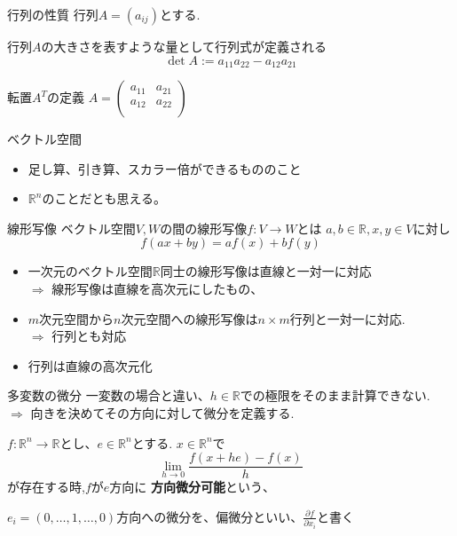 \begin{frame}{行列の性質}
行列$A=(a_{ij})$とする.

行列$A$の大きさを表すような量として行列式が定義される
\begin{equation*}
  \det A := a_{11}a_{22} - a_{12}a_{21}
\end{equation*}

転置$A^T$の定義
$
A = \left(
\begin{array}{ll}
a_{11} & a_{21} \\
a_{12} & a_{22} \\
\end{array}
\right)
$
\end{frame}


\begin{frame}{ベクトル空間}
\begin{itemize}
\item 足し算、引き算、スカラー倍ができるもののこと
\item $\mathbb{R}^n$のことだとも思える。
\end{itemize}
\end{frame}

\begin{frame}{線形写像}
ベクトル空間$V,W$の間の線形写像$f:V \to W$とは
$a,b \in \mathbb{R}, x,y \in V$に対し
\begin{equation*}
f(ax + by) = af(x) + b f(y)
\end{equation*}

\begin{itemize}
\item 一次元のベクトル空間$\mathbb{R}$同士の線形写像は直線と一対一に対応 \\
      $\Rightarrow$ 線形写像は直線を高次元にしたもの、
\item $m$次元空間から$n$次元空間への線形写像は$n \times m$行列と一対一に対応. \\
      $\Rightarrow$ 行列とも対応
\item 行列は直線の高次元化
\end{itemize}
\end{frame}

\begin{frame}{多変数の微分}
一変数の場合と違い、$h \in \mathbb{R}$での極限をそのまま計算できない. \\
$\Rightarrow$ 向きを決めてその方向に対して微分を定義する.
\begin{screen}
$f:\mathbb{R}^n \to \mathbb{R}$とし、$e \in \mathbb{R}^n$とする. $x \in \mathbb{R}^n$で
\begin{equation*}
  \lim_{h\to0}\frac{f(x + he) - f(x)}{h}
\end{equation*}
が存在する時,$f$が$e$方向に \textbf{方向微分可能}という、

$e_i = (0, \ldots, 1, \ldots, 0)$方向への微分を、偏微分といい、$\frac{\partial f}{\partial x_i}$と書く
\end{screen}
\end{frame}

